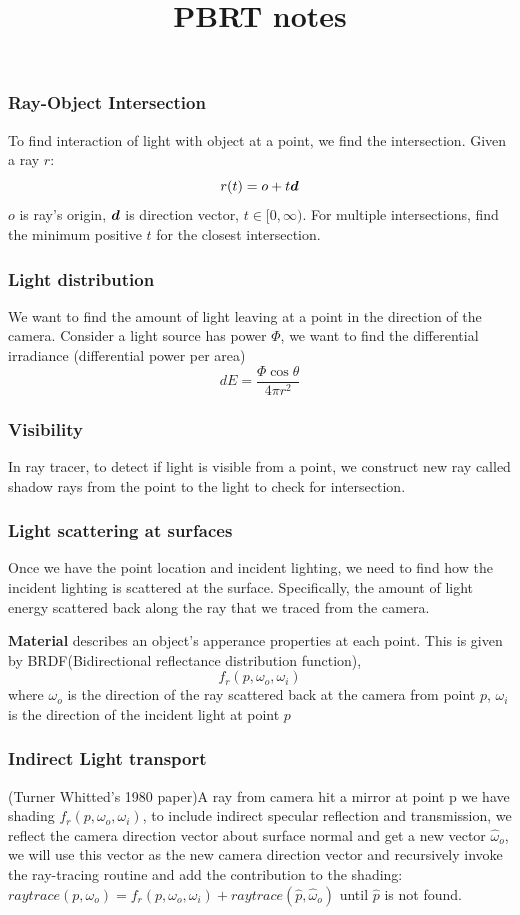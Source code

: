 \documentclass[12pt]{article}
\title{PBRT notes}
\begin{document}
	\maketitle


\subsubsection{Ray-Object Intersection}
To find interaction of light with object at a point, we find the intersection. Given a ray $r$: $$r(t) = o + t \boldsymbol{d}$$
 $o$ is ray's origin, $\boldsymbol{d}$ is direction vector, $t\in [0, \infty)$. For multiple intersections, find the minimum positive $t$ for the closest intersection.

\subsubsection{Light distribution}
We want to find the amount of light leaving at a point in the direction of the camera. Consider a light source has power $\Phi$, we want to find the differential irradiance (differential power per area) $$ dE = \frac{\Phi \cos\theta}{4\pi r^2}$$

\subsubsection{Visibility}
In ray tracer, to detect if light is visible from a point, we construct new ray called shadow rays from the point to the light to check for intersection.

\subsubsection{Light scattering at surfaces}
 Once we have the point location and incident lighting, we need to find how the incident lighting is scattered at the surface. Specifically, the amount of light energy scattered back along the ray that we traced from the camera.

\textbf{Material} describes an object's apperance properties at each point. This is given by BRDF(Bidirectional reflectance distribution function), $$f_r(p, \omega_o, \omega_i)$$ where $\omega_o$ is the direction of the ray scattered back at the camera from point $p$, $\omega_i$ is the direction of the incident light at point $p$

\subsubsection{Indirect Light transport}
(Turner Whitted's 1980 paper)A ray from camera hit a mirror at point p we have shading $f_r(p, \omega_o, \omega_i)$, to include indirect specular reflection and transmission, we reflect the camera direction vector about surface normal and get a new vector  $\hat{\omega}_o$, we will use this vector as the new camera direction vector and recursively invoke the ray-tracing routine and add the contribution to the shading: $raytrace(p, \omega_o) = f_r(p, \omega_o, \omega_i) + raytrace(\hat{p}, \hat{\omega}_o)$ until $\hat{p}$ is not found.
\end{document}
